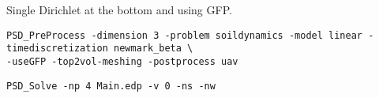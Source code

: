 \newcommand{\psd}[1]{{\small\sffamily{\color{blue!60}#1}}}


Single Dirichlet at the bottom and using GFP.

\begin{lstlisting}[style=BashInputStyle]
PSD_PreProcess -dimension 3 -problem soildynamics -model linear -timediscretization newmark_beta \
-useGFP -top2vol-meshing -postprocess uav
\end{lstlisting}

\begin{lstlisting}[style=BashInputStyle]
PSD_Solve -np 4 Main.edp -v 0 -ns -nw 
\end{lstlisting}
